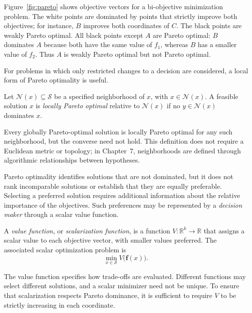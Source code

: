 \begin{example}
\label{ex:pareto}
Figure~\ref{fig:pareto} shows objective vectors for a bi-objective minimization problem. The white points are dominated by points that strictly improve both objectives; for instance, $B$ improves both coordinates of $C$. The black points are weakly Pareto optimal. All black points except $A$ are Pareto optimal: $B$ dominates $A$ because both have the same value of $f_1$, whereas $B$ has a smaller value of $f_2$. Thus $A$ is weakly Pareto optimal but not Pareto optimal.
\end{example}

For problems in which only restricted changes to a decision are considered, a local form of Pareto optimality is useful.

\begin{definition}
\label{def:local_pareto_optimal}
Let $\mathcal{N}(x)\subseteq\mathcal{S}$ be a specified neighborhood of $x$, with $x\in\mathcal{N}(x)$. A feasible solution $x$ is \emph{locally Pareto optimal} relative to $\mathcal{N}(x)$ if no $y\in\mathcal{N}(x)$ dominates $x$.
\end{definition}

Every globally Pareto-optimal solution is locally Pareto optimal for any such neighborhood, but the converse need not hold. This definition does not require a Euclidean metric or topology; in Chapter~7, neighborhoods are defined through algorithmic relationships between hypotheses.

Pareto optimality identifies solutions that are not dominated, but it does not rank incomparable solutions or establish that they are equally preferable. Selecting a preferred solution requires additional information about the relative importance of the objectives. Such preferences may be represented by a \emph{decision maker} through a scalar value function.

\begin{definition}
\label{def:multiobjective_value_function}
A \emph{value function}, or \emph{scalarization function}, is a function $V:\mathbb{R}^k\to\mathbb{R}$ that assigns a scalar value to each objective vector, with smaller values preferred. The associated scalar optimization problem is
\[
\min_{x\in\mathcal{S}}V\bigl(\mathbf{f}(x)\bigr).
\]
\end{definition}

The value function specifies how trade-offs are evaluated. Different functions may select different solutions, and a scalar minimizer need not be unique. To ensure that scalarization respects Pareto dominance, it is sufficient to require $V$ to be strictly increasing in each coordinate.

